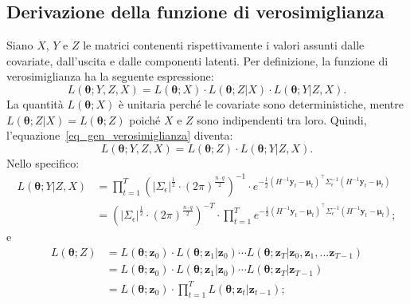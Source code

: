 \subsection[Derivazione della funzione di verosimiglianza]{Derivazione della funzione di verosimiglianza}
Siano $X$, $Y$ e $Z$ le matrici contenenti rispettivamente i valori assunti dalle covariate, dall'uscita e dalle componenti latenti. Per definizione, la funzione di verosimiglianza ha la seguente espressione:
\begin{equation}
	L(\boldsymbol{\theta}; Y,Z,X) = L(\boldsymbol{\theta}; X)\cdot L(\boldsymbol{\theta}; Z|X)\cdot L(\boldsymbol{\theta}; Y|Z,X).
	\label{eq_gen_verosimiglianza}
\end{equation}
La quantità $L(\boldsymbol{\theta}; X)$ è unitaria perché le covariate sono deterministiche, mentre $L(\boldsymbol{\theta}; Z|X) = L(\boldsymbol{\theta}; Z)$ poiché $X$ e $Z$ sono indipendenti tra loro. Quindi, l'equazione~\ref{eq_gen_verosimiglianza} diventa:
\begin{equation}
	L(\boldsymbol{\theta}; Y,Z,X) =  L(\boldsymbol{\theta}; Z)\cdot L(\boldsymbol{\theta}; Y|Z,X).
	\label{eq_gen_verosimiglianza_2}
\end{equation}
Nello specifico:
\begin{equation}
	\begin{split}
		L(\boldsymbol{\theta}; Y|Z, X) & = \prod_{t=1}^{T}\left(|\Sigma_\epsilon|^\frac{1}{2}\cdot\left(2\pi\right)^\frac{n\cdot q}{2}\right)^{-1}\cdot e^{-\frac{1}{2}\left(H^{-1}\mathbf{y}_t - \boldsymbol{\mu}_t\right)^\top\Sigma_\epsilon^{-1}\left(H^{-1}\mathbf{y}_t - \boldsymbol{\mu}_t\right)} \\
		& = \left(|\Sigma_\epsilon|^\frac{1}{2}\cdot\left(2\pi\right)^\frac{n\cdot q}{2}\right)^{-T}\cdot\prod_{t=1}^{T} e^{-\frac{1}{2}\left(H^{-1}\mathbf{y}_t - \boldsymbol{\mu}_t\right)^\top\Sigma_\epsilon^{-1}\left(H^{-1}\mathbf{y}_t - \boldsymbol{\mu}_t\right)};
	\end{split}
\end{equation}
e
\begin{equation}
	\begin{split}
		L(\boldsymbol{\theta}; Z) & = L(\boldsymbol{\theta}; \mathbf{z}_0)\cdot L(\boldsymbol{\theta}; \mathbf{z}_1|\mathbf{z}_0)\cdots L(\boldsymbol{\theta}; \mathbf{z}_T|\mathbf{z}_0, \mathbf{z}_1,\dots\mathbf{z}_{T-1}) \\
		& = L(\boldsymbol{\theta}; \mathbf{z}_0)\cdot L(\boldsymbol{\theta}; \mathbf{z}_1|\mathbf{z}_0)\cdots L(\boldsymbol{\theta}; \mathbf{z}_T|\mathbf{z}_{T-1})\\
		& = L(\boldsymbol{\theta}; \mathbf{z}_0)\cdot\prod_{t=1}^{T}L(\boldsymbol{\theta};\mathbf{z}_t|\mathbf{z}_{t-1});
	\end{split}
	\label{eq_verosimiglianza_y}
\end{equation}
